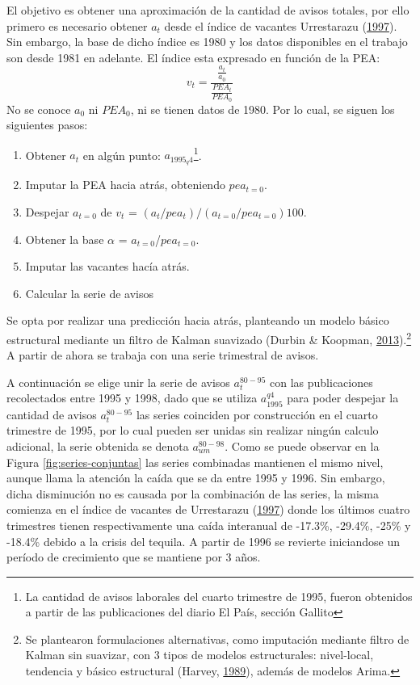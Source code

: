 \documentclass[12pt,oneside]{reedthesis}
\providecommand{\tightlist}{%
  \setlength{\itemsep}{0pt}\setlength{\parskip}{0pt}}
\begin{document}
El objetivo es obtener una aproximación de la cantidad de avisos totales, por ello primero es necesario obtener \(a_t\) desde el índice de vacantes Urrestarazu (\protect\hyperlink{ref-Urrestarazu1997}{1997}). Sin embargo, la base de dicho índice es 1980 y los datos disponibles en el trabajo son desde 1981 en adelante. El índice esta expresado en función de la PEA:
\begin{equation}
v_t = \frac{\frac{a_t}{a_0}}{\frac{PEA_t}{PEA_0}}
\end{equation}
No se conoce \(a_0\) ni \(PEA_0\), ni se tienen datos de 1980. Por lo cual, se siguen los siguientes pasos:
\begin{enumerate}
\def\labelenumi{\arabic{enumi}.}
\tightlist
\item
  Obtener \(a_t\) en algún punto: \(a_{1995_q4}\)\footnote{La cantidad de avisos laborales del cuarto trimestre de 1995, fueron obtenidos a partir de las publicaciones del diario El País, sección Gallito}.
\item
  Imputar la PEA hacia atrás, obteniendo \(pea_{t=0}\).
\item
  Despejar \(a_{t=0}\) de
  \(v_t\) = \((a_t/pea_t)/(a_{t=0}/pea_{t=0})100\).
\item
  Obtener la base \(\alpha\) = \(a_{t=0}\)/\(pea_{t=0}\).
\item
  Imputar las vacantes hacía atrás.
\item
  Calcular la serie de avisos
\end{enumerate}
Se opta por realizar una predicción hacia atrás, planteando un modelo básico estructural mediante un filtro de Kalman suavizado (Durbin \& Koopman, \protect\hyperlink{ref-Durbin2013}{2013}).\footnote{Se plantearon formulaciones alternativas, como imputación mediante filtro de Kalman sin suavizar, con 3 tipos de modelos estructurales: nivel-local, tendencia y básico estructural (Harvey, \protect\hyperlink{ref-Harvey1989}{1989}), además de modelos Arima.} A partir de ahora se trabaja con una serie trimestral de avisos.

A continuación se elige unir la serie de avisos \(a_t^{80-95}\) con las publicaciones recolectados entre 1995 y 1998, dado que se utiliza \(a_{1995}^{q4}\) para poder despejar la cantidad de avisos \(a_t^{80-95}\) las series coinciden por construcción en el cuarto trimestre de 1995, por lo cual pueden ser unidas sin realizar ningún calculo adicional, la serie obtenida se denota \(a_{um}^{80-98}\). Como se puede observar en la Figura \ref{fig:series-conjuntas} las series combinadas mantienen el mismo nivel, aunque llama la atención la caída que se da entre 1995 y 1996. Sin embargo, dicha disminución no es causada por la combinación de las series, la misma comienza en el índice de vacantes de Urrestarazu (\protect\hyperlink{ref-Urrestarazu1997}{1997}) donde los últimos cuatro trimestres tienen respectivamente una caída interanual de -17.3\%, -29.4\%, -25\% y -18.4\% debido a la crisis del tequila. A partir de 1996 se revierte iniciandose un período de crecimiento que se mantiene por 3 años.
\end{document}

